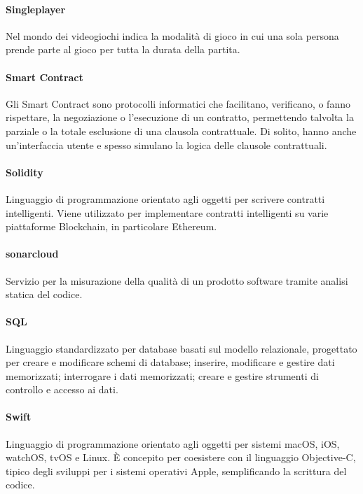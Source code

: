 \documentclass[]{article}
\begin{document}
	\paragraph*{Singleplayer}
	Nel mondo dei videogiochi indica la modalità di gioco in cui una sola persona prende parte al gioco per tutta la durata della partita.

	\paragraph*{Smart Contract}
	Gli Smart Contract sono protocolli informatici che facilitano, verificano, o fanno rispettare, la negoziazione o l'esecuzione di un contratto, permettendo talvolta la parziale o la totale esclusione di una clausola contrattuale. Di solito, hanno anche un'interfaccia utente e spesso simulano la logica delle clausole contrattuali.

	\paragraph*{Solidity}
	Linguaggio di programmazione orientato agli oggetti per scrivere contratti intelligenti. Viene utilizzato per implementare contratti intelligenti su varie piattaforme Blockchain, in particolare Ethereum.

    \paragraph*{sonarcloud}
    Servizio  per la misurazione della qualità di un prodotto software tramite analisi statica del codice.

	\paragraph*{SQL}
	Linguaggio standardizzato per database basati sul modello relazionale, progettato per creare e modificare schemi di database; inserire, modificare e gestire dati memorizzati; interrogare i dati memorizzati; creare e gestire strumenti di controllo e accesso ai dati.

	\paragraph*{Swift}
	Linguaggio di programmazione orientato agli oggetti per sistemi macOS, iOS, watchOS, tvOS e Linux. È concepito per coesistere con il linguaggio Objective-C, tipico degli sviluppi per i sistemi operativi Apple, semplificando la scrittura del codice.
\end{document}
